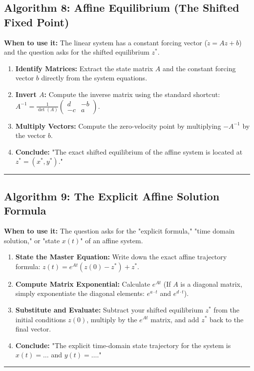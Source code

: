 \documentclass[11pt, a4paper]{report}
\begin{document}
\subsection*{Algorithm 8: Affine Equilibrium (The Shifted Fixed Point)}
\textbf{When to use it:} The linear system has a constant forcing vector ($\dot{z} = Az + b$) and the question asks for the shifted equilibrium $z^*$.
\begin{enumerate}[label=\textbf{\arabic*.}]
    \item \textbf{Identify Matrices:} Extract the state matrix $A$ and the constant forcing vector $b$ directly from the system equations.
    \item \textbf{Invert $A$:} Compute the inverse matrix using the standard shortcut: $A^{-1} = \frac{1}{\det(A)} \begin{pmatrix} d & -b \\ -c & a \end{pmatrix}$.
    \item \textbf{Multiply Vectors:} Compute the zero-velocity point by multiplying $-A^{-1}$ by the vector $b$.
    \item \textbf{Conclude:} "The exact shifted equilibrium of the affine system is located at $z^* = (x^*, y^*)$."
\end{enumerate}
\vspace{1em}
\noindent\rule{\textwidth}{0.4pt}
\vspace{1em}

\subsection*{Algorithm 9: The Explicit Affine Solution Formula}
\textbf{When to use it:} The question asks for the "explicit formula," "time domain solution," or "state $x(t)$" of an affine system.
\begin{enumerate}[label=\textbf{\arabic*.}]
    \item \textbf{State the Master Equation:} Write down the exact affine trajectory formula: $z(t) = e^{At}(z(0) - z^*) + z^*$.
    \item \textbf{Compute Matrix Exponential:} Calculate $e^{At}$ (If $A$ is a diagonal matrix, simply exponentiate the diagonal elements: $e^{a \cdot t}$ and $e^{d \cdot t}$).
    \item \textbf{Substitute and Evaluate:} Subtract your shifted equilibrium $z^*$ from the initial conditions $z(0)$, multiply by the $e^{At}$ matrix, and add $z^*$ back to the final vector.
    \item \textbf{Conclude:} "The explicit time-domain state trajectory for the system is $x(t) = \dots$ and $y(t) = \dots$."
\end{enumerate}
\vspace{1em}
\noindent\rule{\textwidth}{0.4pt}
\vspace{1em}
\end{document}
